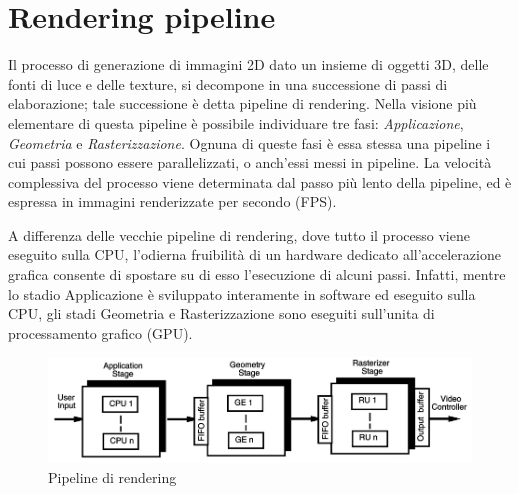 \section{Rendering pipeline}
\label{sec:chapter_stato_arte_rendering_pipeline}

Il processo di generazione di immagini 2D dato un insieme di oggetti 3D, delle fonti di luce e delle texture, si decompone in una successione di passi di elaborazione; tale successione è detta pipeline di rendering. 
Nella visione più elementare di questa pipeline è possibile individuare tre fasi: \emph{Applicazione}, \emph{Geometria} e \emph{Rasterizzazione}.
Ognuna di queste fasi è essa stessa una pipeline i cui passi possono essere parallelizzati, o anch’essi messi in pipeline. La velocità complessiva del processo viene determinata dal passo più lento della pipeline, ed è espressa in immagini renderizzate per secondo (FPS).

A differenza delle vecchie pipeline di rendering, dove tutto il processo viene eseguito sulla CPU, l’odierna fruibilità di un hardware dedicato all’accelerazione grafica consente di spostare su di esso l’esecuzione di alcuni passi. Infatti, mentre lo stadio Applicazione è sviluppato interamente in software ed eseguito sulla CPU, gli stadi Geometria e Rasterizzazione sono eseguiti sull’unita di processamento grafico (GPU).
\\
\begin{figure}[htb]
 \centering
 \includegraphics[width=1.0\linewidth]{images/chapter_stato_arte/stato_arte_pipeline.png}\hfill
 \caption[Pipeline di rendering]{Pipeline di rendering}
 \label{fig:stato_arte_pipeline}
\end{figure}


